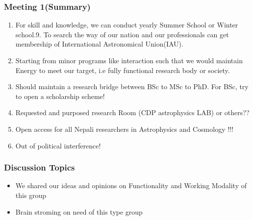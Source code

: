 \documentclass{beamer}
\begin{document}
	\begin{frame}
\frametitle{\bf  Meeting 1(Summary)}	
\begin{enumerate}
	\bf 

	\item \color{red} For skill and knowledge, we can conduct yearly Summer School or
	Winter school.9. To search the way of our nation and our professionals can get
	membership of International Astronomical Union(IAU).
	\item \color{blue} Starting from minor programs like interaction such that we would
	maintain Energy to meet our target, i.e fully functional research body or
	society.
	\item \color{red} Should maintain a research bridge between BSc to MSc to PhD. For
	BSc, try to open a scholarship scheme!
	\item \color{blue} Requested and purposed research Room (CDP astrophysics LAB) or
	others??
	\item \color{red} Open access for all Nepali researchers in Astrophysics and
	Cosmology !!!
	\item \color{blue} Out of political interference!
	
\end{enumerate}
\end{frame}

\begin{frame}
\frametitle{\bf Discussion Topics}
\begin{itemize}
	\bf 
	\item \color{blue} We shared our ideas and opinions on Functionality and Working Modality of this group
	\item \color{red} Brain stroming on need of this type group 
\end{itemize}
\end{frame}
\end{document}

